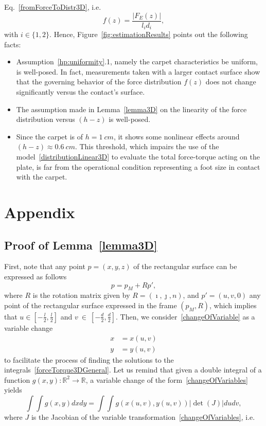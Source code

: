 \documentclass[12pt,a4paper,twoside]{article}
\begin{document}
Eq.~\eqref{fromForceToDistr3D}, i.e. 
\begin{equation}
f(z) = \frac{|F_E(z)|}{l_id_i}, \nonumber
\end{equation}
with $i \in \{1,2\}$. Hence, Figure~\ref{fig:estimationResults} points out the following facts:
\begin{itemize}
\item Assumption~\ref{hp:uniformity}.1, namely the carpet characteristics be uniform,  is well-posed. In fact, measurements taken with a larger contact surface show that the governing behavior of the force distribution $f(z)$ does not change significantly versus the contact's surface.  
\item The assumption made in Lemma~\ref{lemma3D} on the linearity of the force distribution  versus $(h-z)$ is well-posed. 
\item Since the carpet is of $h= 1 \ cm$, it shows some nonlinear effects around $(h-z)\approx 0.6 \ cm$. This threshold, which impairs the use of the model~\eqref{distributionLinear3D} to evaluate the total force-torque acting on the plate, is far from the operational condition representing a foot size in contact with the carpet.   
\end{itemize}









\newpage
\section*{Appendix}
\subsection*{Proof of Lemma~\ref{lemma3D}}
First, note that any point $p=(x,y,z)$ of the rectangular surface can be expressed as follows
\begin{equation}
\label{changeOfVariable}
p = p_M + Rp',
\end{equation}
where $R$ is the rotation matrix given by $R = (\imath,\jmath,n)$, and $p'=(u,v,0)$ any point of the rectangular surface expressed in the frame $(p_M,R)$, which implies that $u\in \left[-\frac{l}{2},\frac{l}{2}\right]$ and
$v~\in~\left[-\frac{d}{2},\frac{d}{2}\right]$. Then, we consider~\eqref{changeOfVariable} as a variable change 
\begin{subequations}
	\label{changeOfVariables}
    \begin{alignat}{2}
x &= x(u,v) \label{xUvu}
\\
y &= y(u,v)  
\label{yUvi} 
    \end{alignat}
\end{subequations}
to facilitate the process of finding the solutions to the integrals~\eqref{forceTorque3DGeneral}. Let us  remind that given a double integral of a function $g(x,y): \mathbb{R}^2 \rightarrow \mathbb{R}$, a variable change of the form~\eqref{changeOfVariables} yields 
 \begin{equation}
 \int\int g(x,y) dx dy = \int\int g(x(u,v),y(u,v)) |\det(J)|dudv, 
\end{equation}
where $J$ is the Jacobian of the variable transformation~\eqref{changeOfVariables}, i.e.
\end{document}
